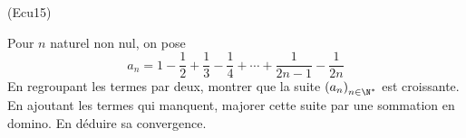 \begin{tiny}(Ecu15)\end{tiny} Pour $n$ naturel non nul, on pose
\begin{displaymath}
  a_n = 1-\frac{1}{2} + \frac{1}{3} - \frac{1}{4} +\cdots + \frac{1}{2n-1} - \frac{1}{2n}
\end{displaymath}
En regroupant les termes par deux, montrer que la suite $\left( a_n\right)_{n\in \N^*}$ est croissante. En ajoutant les termes qui manquent, majorer cette suite par une sommation en domino. En déduire sa convergence.